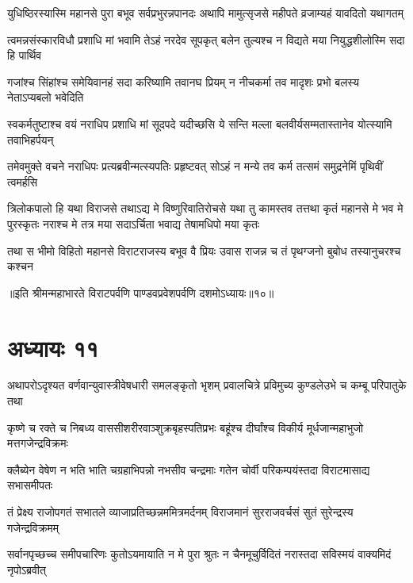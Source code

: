 \twolineshloka
{युधिष्ठिरस्यास्मि महानसे पुरा बभूव सर्वप्रभुरन्नपानदः}
{अथापि मामुत्सृजसे महीपते व्रजाम्यहं यावदितो यथागतम्}


\twolineshloka
{त्वमन्नसंस्कारविधौ प्रशाधि मां भवामि तेऽहं नरदेव सूपकृत्}
{बलेन तुल्यश्च न विद्यते मया नियुद्धशीलोस्मि सदा हि पार्थिव}


\twolineshloka
{गजांश्च सिंहांश्च समेयिवानहं सदा करिष्यामि तवानघ प्रियम्}
{न नीचकर्मा तव मादृशः प्रभो बलस्य नेताऽप्यबलो भवेदिति}


\twolineshloka
{स्वकर्मतुष्टाश्च वयं नराधिप प्रशाधि मां सूदपदे यदीच्छसि}
{ये सन्ति मल्ला बलवीर्यसम्मतास्तानेव योत्स्यामि तवाभिहर्पयन्}



\twolineshloka
{तमेवमुक्ते वचने नराधिपः प्रत्यब्रवीन्मत्स्यपतिः प्रहृष्टवत्}
{सोऽहं न मन्ये तव कर्म तत्समं समुद्रनेमिं पृथिवीं त्वमर्हसि}


\threelineshloka
{त्रिलोकपालो हि यथा विराजसे तथाऽद्य मे विष्णुरिवातिरोचसे}
{यथा तु कामस्तव तत्तथा कृतं महानसे मे भव मे पुरस्कृतः}
{नराश्च मे तत्र मया सदाऽर्चिता भवाद्य तेषामधिपो मया कृतः}


\twolineshloka
{तथा स भीमो विहितो महानसे विराटराजस्य बभूव वै प्रियः}
{उवास राजन्न च तं पृथग्जनो बुबोध तस्यानुचरश्च कश्चन}

॥इति श्रीमन्महाभारते विराटपर्वणि पाण्डवप्रवेशपर्वणि दशमोऽध्यायः॥१०॥

\chapter{अध्यायः ११}

\twolineshloka
{अथापरोऽदृश्यत वर्णवान्युवा}{स्त्रीवेषधारी समलङ्कृतो भृशम्}
{प्रवालचित्रे प्रविमुच्य कुण्डले}{उभे च कम्बू परिपातुके तथा}


\twolineshloka
{कृष्णे च रक्ते च निबध्य वाससी}{शरीरवाञ्शुक्रबृहस्पतिप्रभः}
{बहूंश्च दीर्घांश्च विकीर्य मूर्धजान्}{महाभुजो मत्तगजेन्द्रविक्रमः}


\twolineshloka
{क्लैब्येन वेषेण न भति भाति च}{ग्रहाभिपन्नो नभसीव चन्द्रमाः}
{गतेन चोर्वी परिकम्पयंस्तदा विराटमासाद्य सभासमीपतः}


\twolineshloka
{तं प्रेक्ष्य राजोपगतं सभातले व्याजाप्रतिच्छन्नममित्रमर्दनम्}
{विराजमानं सुरराजवर्चसं सुतं सुरेन्द्रस्य गजेन्द्रविक्रमम्}


\twolineshloka
{सर्वानपृच्छच्च समीपचारिणः कुतोऽयमायाति न मे पुरा श्रुतः}
{न चैनमूचुर्विदितं नरास्तदा सविस्मयं वाक्यमिदं नृपोऽब्रवीत्}




